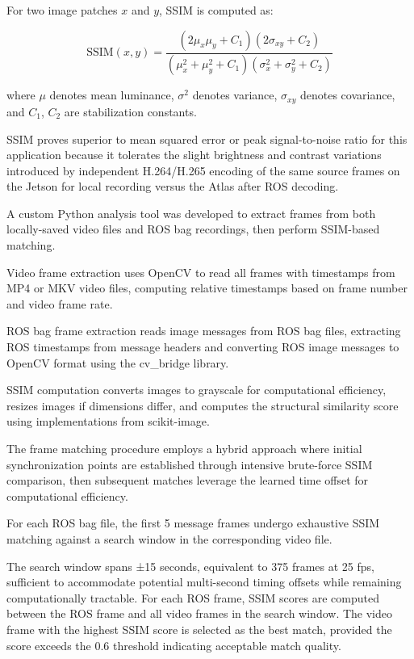 \documentclass{erauthesis}
\begin{document}
For two image patches $x$ and $y$, SSIM is computed as:

\begin{equation}
    \text{SSIM}(x,y) = \frac{(2\mu_x\mu_y + C_1)(2\sigma_{xy} + C_2)}{(\mu_x^2 + \mu_y^2 + C_1)(\sigma_x^2 + \sigma_y^2 + C_2)}
\end{equation}


where $\mu$ denotes mean luminance, $\sigma^2$ denotes variance, $\sigma_{xy}$ denotes covariance, and $C_1$, $C_2$ are stabilization constants.

SSIM proves superior to mean squared error or peak signal-to-noise ratio for this application because it tolerates the slight brightness and contrast variations introduced by independent H.264/H.265 encoding of the same source frames on the Jetson for local recording versus the Atlas after ROS decoding.


A custom Python analysis tool was developed to extract frames from both locally-saved video files and ROS bag recordings, then perform SSIM-based matching.

Video frame extraction uses OpenCV to read all frames with timestamps from MP4 or MKV video files, computing relative timestamps based on frame number and video frame rate.

ROS bag frame extraction reads image messages from ROS bag files, extracting ROS timestamps from message headers and converting ROS image messages to OpenCV format using the cv\_bridge library.

SSIM computation converts images to grayscale for computational efficiency, resizes images if dimensions differ, and computes the structural similarity score using implementations from scikit-image.


The frame matching procedure employs a hybrid approach where initial synchronization points are established through intensive brute-force SSIM comparison, then subsequent matches leverage the learned time offset for computational efficiency.


For each ROS bag file, the first 5 message frames undergo exhaustive SSIM matching against a search window in the corresponding video file.

The search window spans ±15 seconds, equivalent to 375 frames at 25 fps, sufficient to accommodate potential multi-second timing offsets while remaining computationally tractable.
For each ROS frame, SSIM scores are computed between the ROS frame and all video frames in the search window.
The video frame with the highest SSIM score is selected as the best match, provided the score exceeds the 0.6 threshold indicating acceptable match quality.
\end{document}
